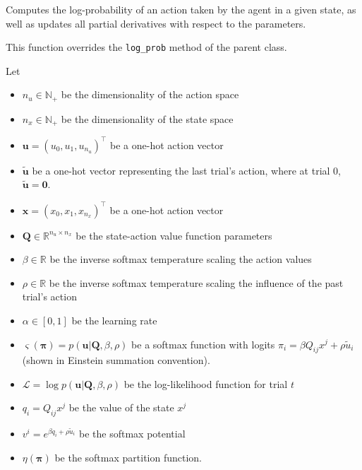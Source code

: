 \begin{Shaded}
\begin{Highlighting}[]
\end{Highlighting}
\end{Shaded}

Computes the log-probability of an action taken by the agent in a given
state, as well as updates all partial derivatives with respect to the
parameters.

This function overrides the \texttt{log\_prob} method of the parent
class.

Let

\begin{itemize}
\tightlist
\item
  \(n_u \in \mathbb N_+\) be the dimensionality of the action space
\item
  \(n_x \in \mathbb N_+\) be the dimensionality of the state space
\item
  \(\mathbf u = (u_0, u_1, u_{n_u})^\top\) be a one-hot action vector
\item
  \(\tilde{\mathbf u}\) be a one-hot vector representing the last
  trial's action, where at trial 0, \(\tilde{\mathbf u} = \mathbf 0\).
\item
  \(\mathbf x = (x_0, x_1, x_{n_x})^\top\) be a one-hot action vector
\item
  \(\mathbf Q \in \mathbb R^{n_u \times n_x}\) be the state-action value
  function parameters
\item
  \(\beta \in \mathbb R\) be the inverse softmax temperature scaling the
  action values
\item
  \(\rho \in \mathbb R\) be the inverse softmax temperature scaling the
  influence of the past trial's action
\item
  \(\alpha \in [0, 1]\) be the learning rate
\item
  \(\varsigma(\boldsymbol\pi) = p(\mathbf u | \mathbf Q, \beta, \rho)\)
  be a softmax function with logits
  \(\pi_i = \beta Q_{ij} x^j + \rho \tilde{u}_i\) (shown in Einstein
  summation convention).
\item
  \(\mathcal L = \log p(\mathbf u | \mathbf Q, \beta, \rho)\) be the
  log-likelihood function for trial \(t\)
\item
  \(q_i = Q_{ij} x^j\) be the value of the state \(x^j\)
\item
  \(v^i = e^{\beta q_i + \rho \tilde{u}_i}\) be the softmax potential
\item
  \(\eta(\boldsymbol\pi)\) be the softmax partition function.
\end{itemize}


